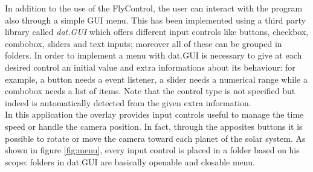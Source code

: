 \documentclass[paper=a4, fontsize=11pt]{scrartcl} %
\numberwithin{equation}{section} %
\numberwithin{figure}{section} %
\numberwithin{table}{section} %
\theoremstyle{definition}
\begin{document}
In addition to the use of the FlyControl, the user can interact with the program also through a simple GUI menu. This has been implemented using a third party library called \textit{dat.GUI} \cite{datgui} which offers different input controls like buttons, checkbox, combobox, sliders and text inputs; moreover all of these can be grouped in folders. In order to implement a menu with dat.GUI is necessary to give at each desired control an initial value and extra informations about its behaviour: for example, a button needs a event listener, a slider needs a numerical range while a combobox needs a list of items. Note that the control type is not specified but indeed is automatically detected from the given extra information.\\
In this application the overlay provides input controls useful to manage the time speed or handle the camera position. In fact, through the apposites buttons it is possible to rotate or move the camera toward each planet of the solar system.
As shown in figure \ref{fig:menu}, every input control is placed in a folder based on his scope: folders in dat.GUI are basically openable and closable menu.\\
\end{document}
